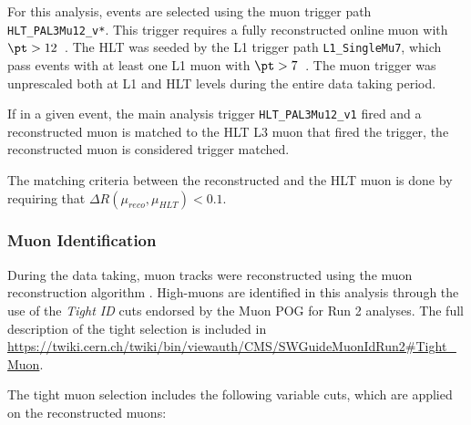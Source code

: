 For this analysis, events are selected using the muon trigger path \verb#HLT_PAL3Mu12_v*#. This trigger requires a fully reconstructed online muon with $\pt > 12$~\GeVc. The HLT was seeded by the L1 trigger path \verb#L1_SingleMu7#, which pass events with at least one L1 muon with $\pt > 7$~\GeVc. The muon trigger was unprescaled both at L1 and HLT levels during the entire data taking period.

If in a given event, the main analysis trigger \verb#HLT_PAL3Mu12_v1# fired and a reconstructed muon is matched to the HLT L3 muon that fired the trigger, the reconstructed muon is considered trigger matched.

The matching criteria between the reconstructed and the HLT muon is done by requiring that $\Delta{R}(\mu_{reco} , \mu_{HLT}) < 0.1$.


\subsubsection{Muon Identification} \label{sec:WBoson_Analysis_MuonIdentification}

During the \pPb data taking, muon tracks were reconstructed using the \pp muon reconstruction algorithm \cite{Muon_Reco}. High-\pt muons are identified in this analysis through the use of the \textit{Tight ID} cuts endorsed by the Muon POG for Run 2 analyses. The full description of the tight selection is included in \url{https://twiki.cern.ch/twiki/bin/viewauth/CMS/SWGuideMuonIdRun2#Tight_Muon}.

The tight muon selection includes the following variable cuts, which are applied on the reconstructed muons:

